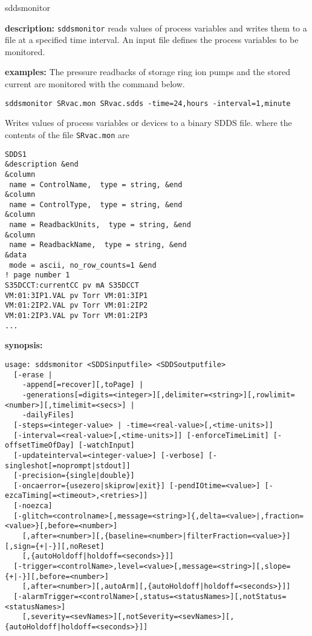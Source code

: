 \begin{sddsprog}{sddsmonitor}
\item \textbf{description:}
\verb+sddsmonitor+ reads values of process variables and writes them to a file at a specified time interval.
An input file defines the process variables to be monitored.
\item \textbf{examples:}
The pressure readbacks of storage ring ion pumps and the stored current are monitored
with the command below.
\begin{verbatim}
sddsmonitor SRvac.mon SRvac.sdds -time=24,hours -interval=1,minute
\end{verbatim}
Writes values of process variables or devices to a binary SDDS file.
where the contents of the file \verb+SRvac.mon+ are
\begin{verbatim}
SDDS1
&description &end
&column
 name = ControlName,  type = string, &end
&column
 name = ControlType,  type = string, &end
&column
 name = ReadbackUnits,  type = string, &end
&column
 name = ReadbackName,  type = string, &end
&data
 mode = ascii, no_row_counts=1 &end
! page number 1
S35DCCT:currentCC pv mA S35DCCT
VM:01:3IP1.VAL pv Torr VM:01:3IP1
VM:01:2IP2.VAL pv Torr VM:01:2IP2
VM:01:2IP3.VAL pv Torr VM:01:2IP3
...
\end{verbatim}
\item \textbf{synopsis:}
\begin{verbatim}
usage: sddsmonitor <SDDSinputfile> <SDDSoutputfile>
  [-erase | 
    -append[=recover][,toPage] | 
    -generations[=digits=<integer>][,delimiter=<string>][,rowlimit=<number>][,timelimit=<secs>] | 
    -dailyFiles]
  [-steps=<integer-value> | -time=<real-value>[,<time-units>]]
  [-interval=<real-value>[,<time-units>]] [-enforceTimeLimit] [-offsetTimeOfDay] [-watchInput]
  [-updateinterval=<integer-value>] [-verbose] [-singleshot[=noprompt|stdout]] 
  [-precision={single|double}]
  [-oncaerror={usezero|skiprow|exit}] [-pendIOtime=<value>] [-ezcaTiming[=<timeout>,<retries>]] 
  [-noezca]
  [-glitch=<controlname>[,message=<string>]{,delta=<value>|,fraction=<value>}[,before=<number>]
    [,after=<number>][,{baseline=<number>|filterFraction=<value>}][,sign={+|-}][,noReset]
    [,{autoHoldoff|holdoff=<seconds>}]]
  [-trigger=<controlName>,level=<value>[,message=<string>][,slope={+|-}][,before=<number>]
    [,after=<number>][,autoArm][,{autoHoldoff|holdoff=<seconds>}]]
  [-alarmTrigger=<controlName>[,status=<statusNames>][,notStatus=<statusNames>]
    [,severity=<sevNames>][,notSeverity=<sevNames>][,{autoHoldoff|holdoff=<seconds>}]]

\end{verbatim}
\end{sddsprog}
